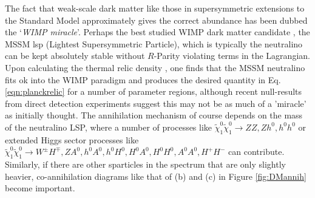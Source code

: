 \begin{enumerate}
The fact that weak-scale dark matter like those in supersymmetric extensions to the Standard Model approximately gives the correct abundance has been dubbed the `\textit{WIMP miracle}'. Perhaps the best studied WIMP dark matter candidate \cite{RN527}, the MSSM \acrshort{lsp} (Lightest Supersymmetric Particle), which is typically the neutralino \lightestneutralino can be kept absolutely stable without $R$-Parity violating terms in the Lagrangian. Upon calculating the thermal relic density \cite{RN501}, one finds that the MSSM neutralino fits ok into the WIMP paradigm and produces the desired quantity in Eq. \ref{eqn:planckrelic} for a number of parameter regions, although recent null-results from direct detection experiments suggest this may not be as much of a 'miracle' as initially thought. The annihilation mechanism of course depends on the mass of the neutralino LSP, where a number of processes like $\tilde{\chi}^0_1 \tilde{\chi}^0_1 \rightarrow ZZ,Zh^0,h^0 h^0$ or extended Higgs sector processes like $\tilde{\chi}^0_1 \tilde{\chi}^0_1 \rightarrow W^{\pm}H^{\mp},ZA^0,h^0 A^0,h^0 H^0, H^0 A^0, H^0 H^0, A^0 A^0, H^+ H^-$ can contribute. Similarly, if there are other sparticles in the spectrum that are only slightly heavier, co-annihilation diagrams like that of (b) and (c) in Figure \ref{fig:DMannih} become important.
\begin{center}
\end{center}
\end{enumerate}
